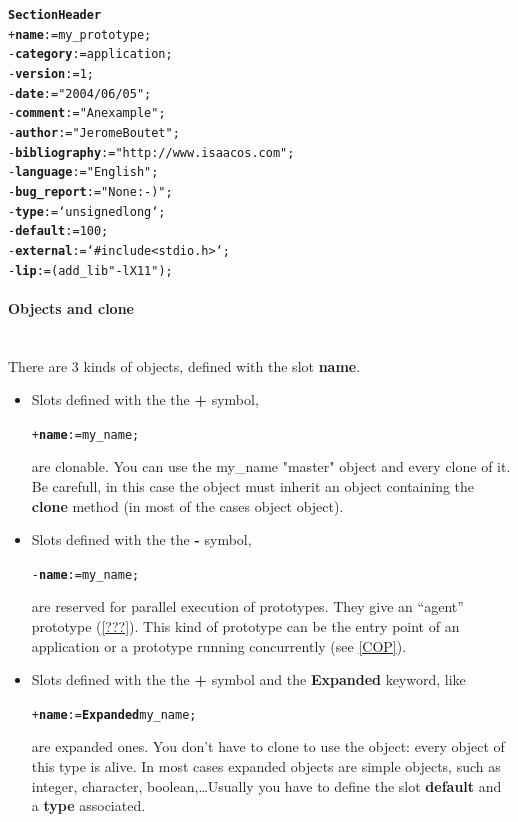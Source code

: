 \documentclass[11pt]{mybook}
\begin{document}
\begin{alltt} 
{\bf{}Section Header}
  + {\bf{}name} := {\sc{}my\_prototype};
  - {\bf{}category} := {\sc{}application};
  - {\bf{}version} := {\sc{}1};
  - {\bf{}date} := {\sc{}"2004/06/05"};
  - {\bf{}comment} := "An example";
  - {\bf{}author} := "Jerome Boutet";
  - {\bf{}bibliography} := "http://www.isaacos.com";
  - {\bf{}language} := "English";
  - {\bf{}bug\_report} := "None :-)";
  - {\bf{}type} := `unsigned long`;
  - {\bf{}default} := {\sc{}100};
  - {\bf{}external} := {\sc{}`\#include <stdio.h>`};
  - {\bf{}lip} := ( add\_lib "-lX11" );
\end{alltt}

\paragraph{Objects and clone}
~\\
There are 3 kinds of objects, defined with the slot {\bf{}name}.
\begin{itemize}
\item{} Slots defined with the the {\bf{} +} symbol,
\begin{alltt}
  + {\bf{} name} := {\sc{}my\_name};
\end{alltt}
are clonable. 
You can use the {\sc{}my\_name} "master" object and every clone of it. 
Be carefull, in this case the object must inherit an object containing 
the {\bf{}clone} method (in most of the cases object {\sc{}object}).

\item{}Slots defined with the the {\bf{} -} symbol, 
\begin{alltt}
  - {\bf{} name} := {\sc{}my\_name};
\end{alltt}
are reserved for parallel execution of prototypes. They give an ``agent'' prototype (\ref{???}).
This kind of prototype can be the entry point of an application or a prototype running concurrently (see \ref{COP}).

\item{}
Slots defined with the the {\bf{} +} symbol and the {\bf{}Expanded} keyword, like 
\begin{alltt}
  + {\bf{} name} := {\bf{}Expanded} {\sc{}my\_name};
\end{alltt}
are expanded ones. You don't have to clone to use the object: every object of this type is alive. 
In most cases expanded objects are simple objects, such as {\sc{}integer}, {\sc{}character}, 
{\sc{}boolean},\ldots Usually you have to define the slot {\bf{} default} and a {\bf{}type} associated.

\end{itemize}
\end{document}

